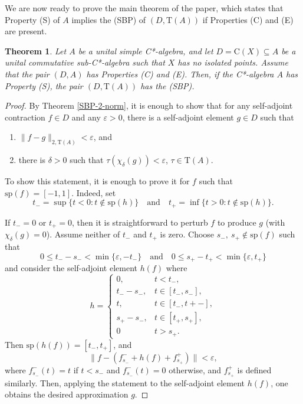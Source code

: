 \documentclass[12pt, oneside, psamsfonts]{amsart}
\newtheorem{thm}{Theorem}[section]
\theoremstyle{definition}
\theoremstyle{remark}
\numberwithin{equation}{section}
\newcommand{\norm}[1]{\| #1\|}
\newcommand{\eps}{\varepsilon}
\newcommand{\tr}{\mathrm{T}}
\begin{document}
We are now ready to prove the main theorem of the paper, which states that Property (S) of $A$ implies the (SBP) of $(D, \tr(A))$ if Properties (C) and (E) are present.


\begin{thm}\label{prop-S}
Let $A$ be a unital simple C*-algebra, and let $D = \mathrm{C}(X) \subseteq A$ be a unital commutative sub-C*-algebra such that $X$ has no isolated points. Assume that the pair $(D, A)$ has Properties (C) and (E). Then, if the C*-algebra $A$ has Property (S), the pair $(D, \tr(A))$ has the (SBP).
\end{thm}

\begin{proof}
By Theorem \ref{SBP-2-norm}, it is enough to show that for any self-adjoint contraction $f \in D$ and any $\eps>0$,  there is a self-adjoint element $g \in D$ such that
\begin{enumerate}
\item $\norm{f - g }_{2, \tr(A)} < \eps$, and
\item there is $\delta>0$ such that $\tau(\chi_\delta(g)) < \eps$, $\tau \in \tr(A)$.
\end{enumerate}


To show this statement, it is enough to prove it for $f$ such that $\mathrm{sp}(f) = [-1, 1]$. Indeed, set 
$$t_- = \sup\{t < 0: t \notin \mathrm{sp}(h)\} \quad \mathrm{and} \quad  t_+ = \inf\{t> 0: t \notin \mathrm{sp}(h)\}.$$

If $t_- = 0$ or $t_+ = 0$, then it is straightforward to perturb $f$ to produce $g$ (with $\chi_\delta(g) = 0$). Assume neither of $t_-$ and $t_+$ is zero. Choose $s_-,\  s_+ \notin \mathrm{sp}(f)$ such that $$0\leq t_- - s_- < \min\{\eps, -t_-\} \quad \mathrm{and} \quad 0\leq s_+ - t_+ < \min\{\eps, t_+\} $$ and consider the self-adjoint element $h(f)$ where
$$ h = \left\{
\begin{array}{ll}
0, & t < t_-, \\
t_- - s_-, & t \in [t_-, s_-], \\
t, & t \in [t_-, t+-], \\
s_+ - s_-, & t \in [t_+, s_+],\\
0 & t > s_+.
 \end{array}
\right. $$
Then $\mathrm{sp}(h(f)) = [t_-, t_+]$, and $$\norm{f - (f^-_{s_-} + h(f) +f^+_{s_+} )} < \eps,$$
where $f^-_{s_-} (t)= t $ if $t < s_-$ and $f^-_{s_-} (t)= 0$ otherwise, and $ f^+_{s_+} $ is defined similarly. Then, applying the statement to the self-adjoint element $h(f)$, one obtains the desired approximation $g$. 


\end{proof}
\end{document}
